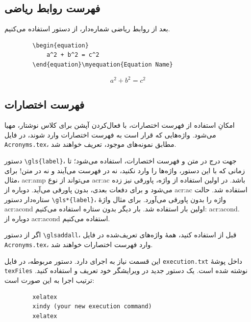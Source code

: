 \subsection{فهرست روابط ریاضی}
بعد از روابط ریاضی شماره‌دار، از دستور
استفاده می‌کنیم.
\begin{latin}
	\begin{verbatim}
		\begin{equation}
		    a^2 + b^2 = c^2
		\end{equation}\myequation{Equation Name}
	\end{verbatim}
\end{latin}
\begin{equation}
	a^2 + b^2 = c^2
\end{equation}

\ifznuUseAcronyms
\subsection{فهرست اختصارات}
امکانِ استفاده از فهرست اختصارات، با فعال‌کردن آپشن
برای کلاس نوشتار، مهیا می‌شود. واژه‌هایی که قرار است به فهرست اختصارات وارد شوند،
در فایل
\verb|Acronyms.tex|،
مطابق نمونه‌های موجود، تعریف خواهند شد.

دستور
\verb|\gls{label}|،
جهت درج در متن و فهرست اختصارات، استفاده می‌شود؛ تا زمانی که با این دستور، واژه‌ها را وارد نکنید،
نه در فهرست می‌آیند و نه در متن! برای مثال،
\gls{acr:amp}
می‌تواند از نوع
\gls{acr:ac}
باشد. در اولین استفاده از واژه، پاورقی نیز زده می‌شود و برای دفعات بعدی، بدون پاورقی می‌آید.
دوباره از
\gls{acr:ac}
استفاده شد. حالت ستاره‌دار دستور
\verb|\gls*{label}|،
واژه را بدون پاورقی می‌آورد. برای مثال واژهٔ
\gls*{acr:acond}
اولین بار استفاده شد. بار دیگر بدون ستاره استفاده می‌کنیم:
\gls{acr:acond}.
دوباره از
\gls{acr:acond}
استفاده می‌کنیم.

اگر از دستور
\verb|\glsaddall|،
قبل از
\verb||
استفاده کنید، همهٔ واژه‌های تعریف‌شده در فایل
\verb|Acronyms.tex|،
وارد فهرست اختصارات خواهند شد.

این قسمت نیاز به اجرای
دارد. دستور مربوطه، در فایل
\verb|execution.txt|
داخل پوشهٔ
\verb|texFiles|
نوشته شده است. یک دستور جدید در ویرایشگر خود تعریف و استفاده کنید. ترتیب اجرا به این صورت است:
\begin{latin}
	\begin{verbatim}
		xelatex
		xindy (your new execution command)
		xelatex
	\end{verbatim}
\end{latin}
\fi

